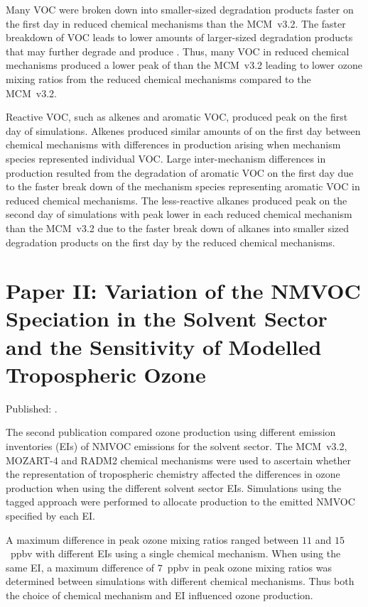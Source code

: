 Many VOC were broken down into smaller-sized degradation products faster on the first day in reduced chemical mechanisms than the MCM~v3.2.
The faster breakdown of VOC leads to lower amounts of larger-sized degradation products that may further degrade and produce .
Thus, many VOC in reduced chemical mechanisms produced a lower peak of  than the MCM~v3.2 leading to lower ozone mixing ratios from the reduced chemical mechanisms compared to the MCM~v3.2.

Reactive VOC, such as alkenes and aromatic VOC, produced peak  on the first day of simulations.
Alkenes produced similar amounts of  on the first day between chemical mechanisms with differences in  production arising when mechanism species represented individual VOC.
Large inter-mechanism differences in  production resulted from the degradation of aromatic VOC on the first day due to the faster break down of the mechanism species representing aromatic VOC in reduced chemical mechanisms.
The less-reactive alkanes produced peak  on the second day of simulations with peak  lower in each reduced chemical mechanism than the MCM~v3.2 due to the faster break down of alkanes into smaller sized degradation products on the first day by the reduced chemical mechanisms.

\singlespacing
\section[Paper II]{Paper II: Variation of the NMVOC Speciation in the Solvent Sector and the Sensitivity of Modelled Tropospheric Ozone} \label{s:EI_results}

\onehalfspacing

\noindent
Published: .

The second publication compared ozone production using different emission inventories (EIs) of NMVOC emissions for the solvent sector.
The MCM~v3.2, MOZART-4 and RADM2 chemical mechanisms were used to ascertain whether the representation of tropospheric chemistry affected the differences in ozone production when using the different solvent sector EIs.
Simulations using the tagged approach were performed to allocate  production to the emitted NMVOC specified by each EI.

A maximum difference in peak ozone mixing ratios ranged between $11$ and $15$~ppbv with different EIs using a single chemical mechanism.
When using the same EI, a maximum difference of $7$~ppbv in peak ozone mixing ratios was determined between simulations with different chemical mechanisms.
Thus both the choice of chemical mechanism and EI influenced ozone production.

